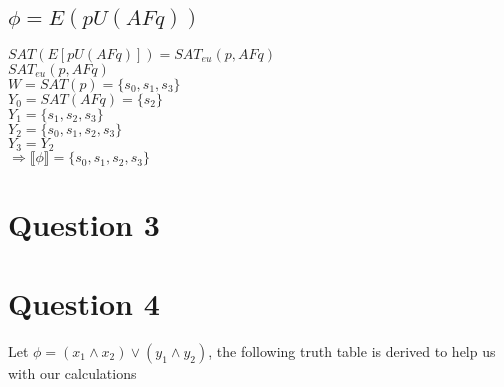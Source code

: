 \documentclass[a4paper,10pt]{article}
\begin{document}
\subsection*{$\phi = E(pU(AFq))$}
\hspace*{5mm}$SAT(E[pU(AFq)]) = SAT_{eu}(p,AFq)$ 
\\[0.25cm] 
\hspace*{5mm}$SAT_{eu}(p,AFq)$ 
\\[0.25cm] 
\hspace*{10mm}$W = SAT(p) = \{s_0,s_1,s_3\}$
\\[0.25cm] 
\hspace*{10mm}$Y_0 = SAT(AFq) = \{s_2\}$
\\[0.25cm] 
\hspace*{10mm}$Y_1 = \{s_1,s_2,s_3\}$
\\[0.25cm] 
\hspace*{10mm}$Y_2 = \{s_0,s_1,s_2,s_3\}$
\\[0.25cm] 
\hspace*{10mm}$Y_3 = Y_2$
\\[0.25cm] 
\hspace*{5mm} $\Rightarrow \llbracket \phi \rrbracket = \{s_0,s_1,s_2,s_3\}$




\newpage
\section*{Question 3}
\newpage
\section*{Question 4}
Let $\phi = (x_1 \wedge x_2) \vee (y_1 \wedge y_2) $, the following truth table is derived to help us with our calculations
\end{document}
